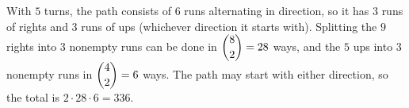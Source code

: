With $5$ turns, the path consists of $6$ runs alternating in direction, so it has $3$ runs of rights and $3$ runs of ups (whichever direction it starts with). Splitting the $9$ rights into $3$ nonempty runs can be done in $\dbinom82=28$ ways, and the $5$ ups into $3$ nonempty runs in $\dbinom42=6$ ways. The path may start with either direction, so the total is $2\cdot28\cdot6=\boxed{336}$.
